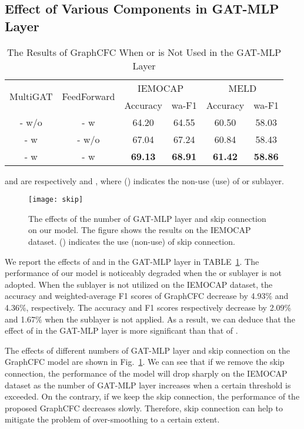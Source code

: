 \documentclass[lettersize,journal]{IEEEtran}
\begin{document}
\subsection{Effect of Various Components in GAT-MLP Layer}
\begin{table}[htbp]
\centering
\renewcommand{\arraystretch}{1.0}
\setlength{\tabcolsep}{5pt}
\caption{The Results of GraphCFC When  or  is Not Used in the GAT-MLP Layer}
\begin{threeparttable}
\begin{tabular}{c|c|cc||cc}
\hline
\multicolumn{1}{c|}{\multirow{2}[0]{*}{MultiGAT}} &\multicolumn{1}{c|}{\multirow{2}[0]{*}{FeedForward}} & \multicolumn{2}{c||}{IEMOCAP} & \multicolumn{2}{c}{MELD} \\
\cline{3-6}
& & Accuracy & wa-F1 & Accuracy & wa-F1 \\
\hline
- w/o & - w & 64.20  & 64.55  & 60.50  & 58.03  \\
- w & - w/o &67.04  & 67.24  & 60.84  & 58.43  \\
\hline
- w & - w &\textbf{69.13}  & \textbf{68.91}  & \textbf{61.42}  & \textbf{58.86}  \\
\hline
\end{tabular}\label{tab:components} and  are respectively  and , where  () indicates the non-use (use) of  or  sublayer.
\end{threeparttable}
\end{table}\begin{figure}[htbp]
\centering
\texttt{[image: skip]}
\caption{The effects of the number of GAT-MLP layer and skip connection on our model. The figure shows the results on the IEMOCAP dataset.  () indicates the use (non-use) of skip connection.}
\label{fig:skip}
\end{figure}
We report the effects of  and  in the GAT-MLP layer in TABLE~\ref{tab:components}. The performance of our model is noticeably degraded when the  or  sublayer is not adopted. When the  sublayer is not utilized on the IEMOCAP dataset, the accuracy and weighted-average F1 scores of GraphCFC decrease by 4.93\% and 4.36\%, respectively. The accuracy and F1 scores respectively decrease by 2.09\% and 1.67\% when the  sublayer is not applied. As a result, we can deduce that the effect of  in the GAT-MLP layer is more significant than that of .

The effects of different numbers of GAT-MLP layer and skip connection on the GraphCFC model are shown in Fig.~\ref{fig:skip}. We can see that if we remove the skip connection, the performance of the model will drop sharply on the IEMOCAP dataset as the number of GAT-MLP layer increases when a certain threshold is exceeded. On the contrary, if we keep the skip connection, the performance of the proposed GraphCFC decreases slowly. Therefore, skip connection can help to mitigate the problem of over-smoothing to a certain extent.
\end{document}
